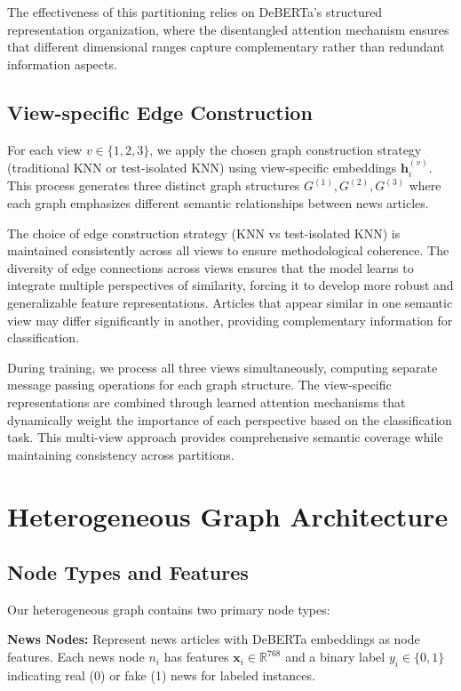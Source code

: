 The effectiveness of this partitioning relies on DeBERTa's structured representation organization, where the disentangled attention mechanism ensures that different dimensional ranges capture complementary rather than redundant information aspects.

\subsection{View-specific Edge Construction}

For each view $v \in \{1, 2, 3\}$, we apply the chosen graph construction strategy (traditional KNN or test-isolated KNN) using view-specific embeddings $\mathbf{h}_i^{(v)}$. This process generates three distinct graph structures $G^{(1)}, G^{(2)}, G^{(3)}$ where each graph emphasizes different semantic relationships between news articles.

The choice of edge construction strategy (KNN vs test-isolated KNN) is maintained consistently across all views to ensure methodological coherence. The diversity of edge connections across views ensures that the model learns to integrate multiple perspectives of similarity, forcing it to develop more robust and generalizable feature representations. Articles that appear similar in one semantic view may differ significantly in another, providing complementary information for classification.

During training, we process all three views simultaneously, computing separate message passing operations for each graph structure. The view-specific representations are combined through learned attention mechanisms that dynamically weight the importance of each perspective based on the classification task. This multi-view approach provides comprehensive semantic coverage while maintaining consistency across partitions.

\section{Heterogeneous Graph Architecture}

\subsection{Node Types and Features}

Our heterogeneous graph contains two primary node types:

\textbf{News Nodes:} Represent news articles with DeBERTa embeddings as node features. Each news node $n_i$ has features $\mathbf{x}_i \in \mathbb{R}^{768}$ and a binary label $y_i \in \{0, 1\}$ indicating real (0) or fake (1) news for labeled instances.

